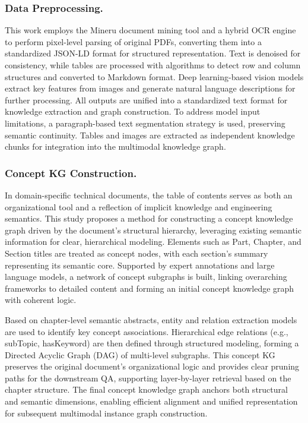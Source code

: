 \documentclass[runningheads]{llncs}
\begin{document}
	\subsubsection{Data Preprocessing.} This work employs the Mineru document mining tool and a hybrid OCR engine to perform pixel-level parsing of original PDFs, converting them into a standardized JSON-LD format for structured representation. Text is denoised for consistency, while tables are processed with algorithms to detect row and column structures and converted to Markdown format. Deep learning-based vision models extract key features from images and generate natural language descriptions for further processing. All outputs are unified into a standardized text format for knowledge extraction and graph construction. To address model input limitations, a paragraph-based text segmentation strategy is used, preserving semantic continuity. Tables and images are extracted as independent knowledge chunks for integration into the multimodal knowledge graph.

    \subsubsection{Concept KG Construction.} In domain-specific technical documents, the table of contents serves as both an organizational tool and a reflection of implicit knowledge and engineering semantics. This study proposes a method for constructing a concept knowledge graph driven by the document's structural hierarchy, leveraging existing semantic information for clear, hierarchical modeling. Elements such as Part, Chapter, and Section titles are treated as concept nodes, with each section's summary representing its semantic core. Supported by expert annotations and large language models, a network of concept subgraphs is built, linking overarching frameworks to detailed content and forming an initial concept knowledge graph with coherent logic.

	Based on chapter-level semantic abstracts, entity and relation extraction models are used to identify key concept associations. Hierarchical edge relations (e.g., subTopic, hasKeyword) are then defined through structured modeling, forming a Directed Acyclic Graph (DAG) of multi-level subgraphs. This concept KG preserves the original document's organizational logic and provides clear pruning paths for the downstream QA, supporting layer-by-layer retrieval based on the chapter structure. The final concept knowledge graph anchors both structural and semantic dimensions, enabling efficient alignment and unified representation for subsequent multimodal instance graph construction.
\end{document}
